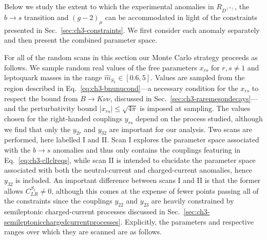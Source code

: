 Below we study the extent to which the experimental anomalies in $R_{D^{(*)}}$,
the $b \to s$ transition and $(g-2)_\mu$ can be accommodated in light of the
constraints presented in Sec.~\ref{sec:ch3-constraints}. We first consider each
anomaly separately and then present the combined parameter space.

For all of the random scans in this section our Monte Carlo strategy proceeds as
follows. We sample random real values of the free parameters $x_{rs}$ for
$r,s \neq 1$ and leptoquark masses in the range $\hat{m}_{S_{1}} \in [0.6, 5]$.
Values are sampled from the region described in Eq.~\eqref{eq:ch3-bnunucond}---a
necessary condition for the $x_{rs}$ to respect the bound from $B \to K\nu\nu$,
discussed in Sec.~\ref{sec:ch3-raremesondecays}---and the perturbativity bound
$|x_{rs}| \leq \sqrt{4\pi}$ is imposed at sampling. The values chosen for the
right-handed couplings $y_{rs}$ depend on the process studied, although we find
that only the $y_{2r}$ and $y_{32}$ are important for our analysis. Two scans
are performed, here labelled I and II. Scan I explores the parameter space
associated with the $b \to s$ anomalies and thus only contains the couplings
featuring in Eq.~\eqref{eq:ch3-cllclreqs}, while scan II is intended to
elucidate the parameter space associated with both the neutral-current and
charged-current anomalies, hence $y_{32}$ is included. An important difference
between scans I and II is that the former allows $C_{LR}^{S_{1}} \neq 0$,
although this comes at the expense of fewer points passing all of the
constraints since the couplings $y_{22}$ and $y_{23}$ are heavily constrained by
semileptonic charged-current processes discussed in
Sec.~\ref{sec:ch3-semileptonicchargedcurrentprocesses}. Explicitly, the
parameters and respective ranges over which they are scanned are as follows.
